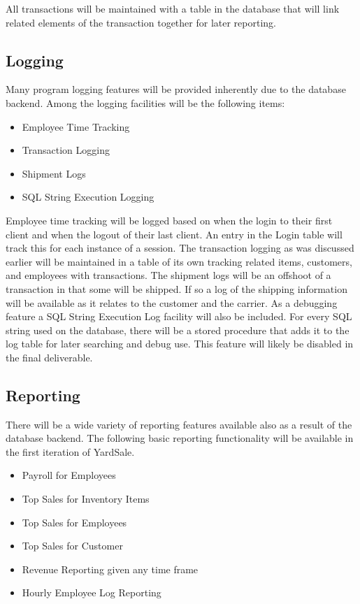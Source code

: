 \documentclass{report}
\begin{document}
    All transactions will be maintained with a table in the database
    that will link related elements of the transaction together for
    later reporting.

    \subsection{Logging}
    Many program logging features will be provided inherently due to
    the database backend. Among the logging facilities will be the
    following items:

    \begin{itemize}
        \item {Employee Time Tracking}
        \item {Transaction Logging}
        \item {Shipment Logs}
        \item {SQL String Execution Logging}
    \end{itemize}

    Employee time tracking will be logged based on when the login to
    their first client and when the logout of their last client. An
    entry in the Login table will track this for each instance of a
    session. The transaction logging as was discussed earlier will be
    maintained in a table of its own tracking related items,
    customers, and employees with transactions. The shipment logs will
    be an offshoot of a transaction in that some will be shipped. If
    so a log of the shipping information will be available as it
    relates to the customer and the carrier. As a debugging feature a
    SQL String Execution Log facility will also be included. For every
    SQL string used on the database, there will be a stored procedure
    that adds it to the log table for later searching and debug use.
    This feature will likely be disabled in the final deliverable.

    \subsection{Reporting}
    There will be a wide variety of reporting features available also
    as a result of the database backend. The following basic reporting
    functionality will be available in the first iteration of
    YardSale.

    \begin{itemize}
        \item{Payroll for Employees}
        \item{Top Sales for Inventory Items}
        \item{Top Sales for Employees}
        \item{Top Sales for Customer}
        \item{Revenue Reporting given any time frame}
        \item{Hourly Employee Log Reporting}
    \end{itemize}
\end{document}
